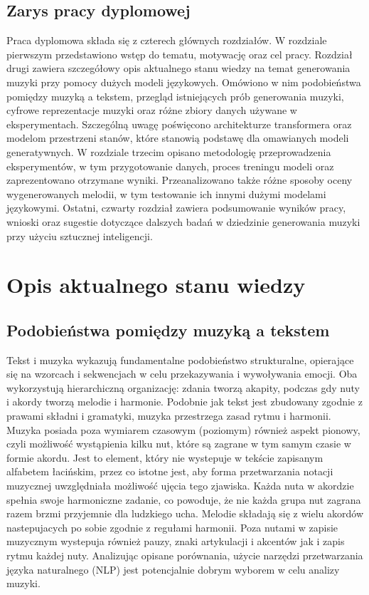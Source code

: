 \documentclass[data-science]{agh-wi} %
\begin{document}
\section{Zarys pracy dyplomowej}
Praca dyplomowa składa się z czterech głównych rozdziałów. W rozdziale pierwszym przedstawiono wstęp do tematu, motywację oraz cel pracy. Rozdział drugi zawiera szczegółowy opis aktualnego stanu wiedzy na temat generowania muzyki przy pomocy dużych modeli językowych. Omówiono w nim podobieństwa pomiędzy muzyką a tekstem, przegląd istniejących prób generowania muzyki, cyfrowe reprezentacje muzyki oraz różne zbiory danych używane w eksperymentach. Szczególną uwagę poświęcono architekturze transformera oraz modelom przestrzeni stanów, które stanowią podstawę dla omawianych modeli generatywnych. W rozdziale trzecim opisano metodologię przeprowadzenia eksperymentów, w tym przygotowanie danych, proces treningu modeli oraz zaprezentowano otrzymane wyniki. Przeanalizowano także różne sposoby oceny wygenerowanych melodii, w tym testowanie ich innymi dużymi modelami językowymi. Ostatni, czwarty rozdział zawiera podsumowanie wyników pracy, wnioski oraz sugestie dotyczące dalszych badań w dziedzinie generowania muzyki przy użyciu sztucznej inteligencji.

\chapter{Opis aktualnego stanu wiedzy}
\section{Podobieństwa pomiędzy muzyką a tekstem}
Tekst i muzyka wykazują fundamentalne podobieństwo strukturalne, opierające się na wzorcach i sekwencjach w celu przekazywania i wywoływania emocji. Oba wykorzystują hierarchiczną organizację: zdania tworzą akapity, podczas gdy nuty i akordy tworzą melodie i harmonie. Podobnie jak tekst jest zbudowany zgodnie z prawami składni i gramatyki, muzyka przestrzega zasad rytmu i harmonii. Muzyka posiada poza wymiarem czasowym (poziomym) również aspekt pionowy, czyli możliwość wystąpienia kilku nut, które są zagrane w tym samym czasie w formie akordu. Jest to element, który nie wystepuje w tekście zapisanym alfabetem łacińskim, przez co istotne jest, aby forma przetwarzania notacji muzycznej uwzględniała możliwość ujęcia tego zjawiska. Każda nuta w akordzie spełnia swoje harmoniczne zadanie, co powoduje, że nie każda grupa nut zagrana razem brzmi przyjemnie dla ludzkiego ucha. Melodie składają się z wielu akordów nastepujacych po sobie zgodnie z regułami harmonii. Poza nutami w zapisie muzycznym wystepuja również pauzy, znaki artykulacji i akcentów jak i zapis rytmu każdej nuty. Analizując opisane porównania, użycie narzędzi przetwarzania języka naturalnego (NLP) jest potencjalnie dobrym wyborem w celu analizy muzyki.
\end{document}
